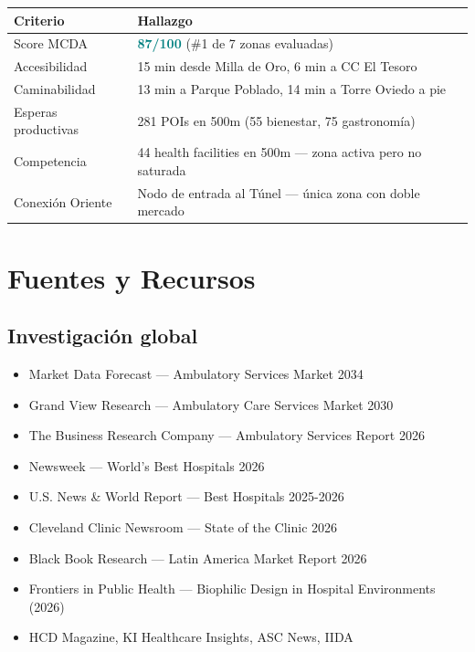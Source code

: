 \documentclass[11pt, a4paper]{article}
\newcommand{\highlight}[1]{\textcolor{teal}{\textbf{#1}}}
\begin{document}
\begin{center}
\begin{tabular}{@{}p{4cm}p{9cm}@{}}
\toprule
\textbf{Criterio} & \textbf{Hallazgo} \\
\midrule
Score MCDA & \highlight{87/100} (\#1 de 7 zonas evaluadas) \\
Accesibilidad & 15 min desde Milla de Oro, 6 min a CC El Tesoro \\
Caminabilidad & 13 min a Parque Poblado, 14 min a Torre Oviedo a pie \\
Esperas productivas & 281 POIs en 500m (55 bienestar, 75 gastronom\'{i}a) \\
Competencia & 44 health facilities en 500m — zona activa pero no saturada \\
Conexi\'{o}n Oriente & Nodo de entrada al T\'{u}nel — \'{u}nica zona con doble mercado \\
\bottomrule
\end{tabular}
\end{center}

\section{Fuentes y Recursos}

\subsection{Investigaci\'{o}n global}
\begin{itemize}[leftmargin=1cm]\small
  \item Market Data Forecast — Ambulatory Services Market 2034
  \item Grand View Research — Ambulatory Care Services Market 2030
  \item The Business Research Company — Ambulatory Services Report 2026
  \item Newsweek — World's Best Hospitals 2026
  \item U.S. News \& World Report — Best Hospitals 2025-2026
  \item Cleveland Clinic Newsroom — State of the Clinic 2026
  \item Black Book Research — Latin America Market Report 2026
  \item Frontiers in Public Health — Biophilic Design in Hospital Environments (2026)
  \item HCD Magazine, KI Healthcare Insights, ASC News, IIDA
\end{itemize}
\end{document}
